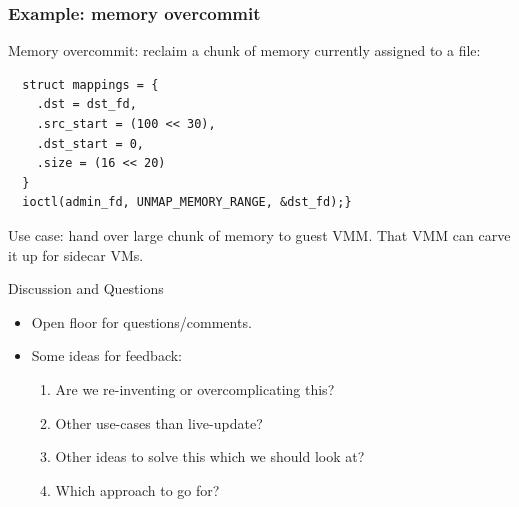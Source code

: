 \documentclass{beamer}
\begin{document}
\begin{frame}[fragile]
  \frametitle{Example: memory overcommit}
  Memory overcommit: reclaim a chunk of memory currently assigned to a file:

  \begin{verbatim}
  struct mappings = {
    .dst = dst_fd,
    .src_start = (100 << 30),
    .dst_start = 0,
    .size = (16 << 20)
  }
  ioctl(admin_fd, UNMAP_MEMORY_RANGE, &dst_fd);}
  \end{verbatim}
  \vspace{0.7cm}
  Use case: hand over large chunk of memory to guest VMM. That VMM can carve it up for sidecar VMs.
\end{frame}

\begin{frame}{Discussion and Questions}
  \begin{itemize}
    \item Open floor for questions/comments.
    \item Some ideas for feedback:
      \begin{enumerate}
        \item Are we re-inventing or overcomplicating this?
        \item Other use-cases than live-update?
        \item Other ideas to solve this which we should look at?
        \item Which approach to go for?
      \end{enumerate}
  \end{itemize}
\end{frame}
\end{document}
